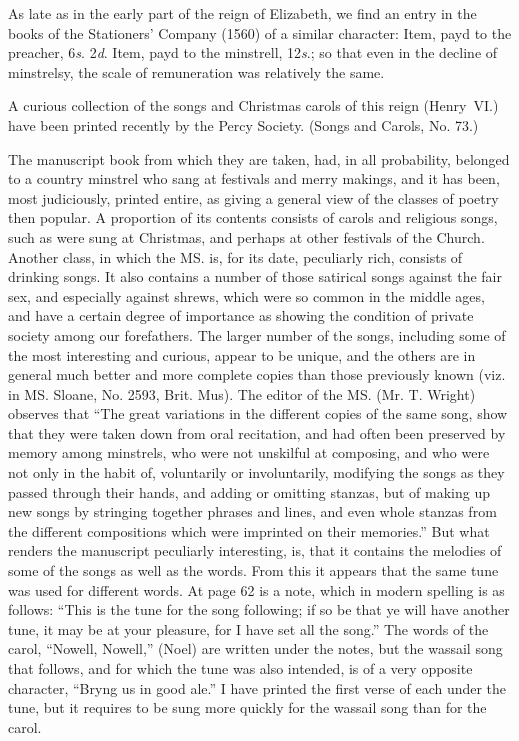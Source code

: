 As late as in the early part of the reign of Elizabeth, we find an entry in the
books of the Stationers’ Company (1560) of a similar character: Item, payd to
the preacher, 6\textit{s}. 2\textit{d}. Item, payd to the minstrell, 12\textit{s}.; so that even in the
decline of minstrelsy, the scale of remuneration was relatively the same.

A curious collection of the songs and Christmas carols of this reign (Henry~VI.) 
have been printed recently by the Percy Society. (Songs and Carols, No. 73.)

The manuscript book from which they are taken, had, in all probability, belonged
to a country minstrel who sang at festivals and merry makings, and it has been,
most judiciously, printed entire, as giving a general view of the classes of poetry
then popular. A proportion of its contents consists of carols and religious songs,
such as were sung at Christmas, and perhaps at other festivals of the Church.
Another class, in which the MS. is, for its date, peculiarly rich, consists of
drinking songs. It also contains a number of those satirical songs against the
fair sex, and especially against shrews, which were so common in the middle ages,
and have a certain degree of importance as showing the condition of private
society among our forefathers. The larger number of the songs, including some
of the most interesting and curious, appear to be unique, and the others
are in general much better and more complete copies than those previously
known (viz. in MS. Sloane, No. 2593, Brit. Mus). The editor of the MS.
(Mr. T. Wright) observes that “The great variations in the different copies of
the same song, show that they were taken down from oral recitation, and had
often been preserved by memory among minstrels, who were not unskilful at
composing, and who were not only in the habit of, voluntarily or involuntarily,
modifying the songs as they passed through their hands, and adding or omitting
stanzas, but of making up new songs by stringing together phrases and lines, and
even whole stanzas from the different compositions which were imprinted on their
memories.” But what renders the manuscript peculiarly interesting, is, that it
contains the melodies of some of the songs as well as the words. From this it
appears that the same tune was used for different words. At page 62 is a note,
which in modern spelling is as follows: “This is the tune for the song following;
if so be that ye will have another tune, it may be at your pleasure, for I have set
all the song.” The words of the carol, “Nowell, Nowell,” (Noel) are written
under the notes, but the wassail song that follows, and for which the tune was also
intended, is of a very opposite character, “Bryng us in good ale.” I have
printed the first verse of each under the tune, but it requires to be sung more
quickly for the wassail song than for the carol.
\pagebreak %

